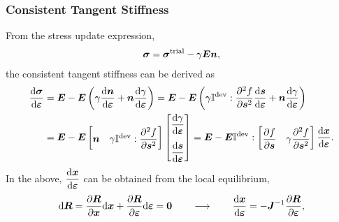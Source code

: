     \subsubsection{Consistent Tangent Stiffness}
    From the stress update expression,
    \begin{gather}
        \bm{\sigma}=\bm{\sigma}^\text{trial}-\gamma\bm{E}\bm{n},
    \end{gather}
    the consistent tangent stiffness can be derived as
    \begin{gather}
        \begin{split}
            \dfrac{\mathrm{d}\bm{\sigma}}{\mathrm{d}\bm{\varepsilon}} & =\bm{E}-\bm{E}\left(\gamma\dfrac{\mathrm{d}\bm{n}}{\mathrm{d}\bm{\varepsilon}}+\bm{n}\dfrac{\mathrm{d}\gamma}{\mathrm{d}\bm{\varepsilon}}\right)=\bm{E}-\bm{E}\left(\gamma\mathbb{I}^\text{dev}:\dfrac{\partial{^2f}}{\partial{\bm{s}^2}}\dfrac{\mathrm{d}\bm{s}}{\mathrm{d}\bm{\varepsilon}}+\bm{n}\dfrac{\mathrm{d}\gamma}{\mathrm{d}\bm{\varepsilon}}\right) \\
                                           & =\bm{E}-\bm{E}\begin{bmatrix}
                                                               \bm{n} & \gamma\mathbb{I}^\text{dev}:\dfrac{\partial{^2f}}{\partial{\bm{s}^2}}
                                                           \end{bmatrix}\begin{bmatrix}
                                                                            \dfrac{\mathrm{d}\gamma}{\mathrm{d}\bm{\varepsilon}} \\[4mm]
                                                                            \dfrac{\mathrm{d}\bm{s}}{\mathrm{d}\bm{\varepsilon}}
                                                                        \end{bmatrix}=\bm{E}-\bm{E}\mathbb{I}^\text{dev}:\begin{bmatrix}
                                                                                                                            \dfrac{\partial{f}}{\partial{\bm{s}}} & \gamma\dfrac{\partial{^2f}}{\partial{\bm{s}^2}}
                                                                                                                        \end{bmatrix}\dfrac{\mathrm{d}\bm{x}}{\mathrm{d}\bm{\varepsilon}}.
        \end{split}
    \end{gather}
    In the above, $\dfrac{\mathrm{d}\bm{x}}{\mathrm{d}\bm{\varepsilon}}$ can be obtained from the local equilibrium,
    \begin{gather}
        \mathrm{d}\bm{R}=\dfrac{\partial{\bm{R}}}{\partial{\bm{x}}}\mathrm{d}\bm{x}+\dfrac{\partial{\bm{R}}}{\partial{\bm{\varepsilon}}}\mathrm{d}\bm{\varepsilon}=\bm{0}\qquad\longrightarrow\qquad\dfrac{\mathrm{d}\bm{x}}{\mathrm{d}\bm{\varepsilon}}=-\bm{J}^{-1}\dfrac{\partial{\bm{R}}}{\partial{\bm{\varepsilon}}},
    \end{gather}
